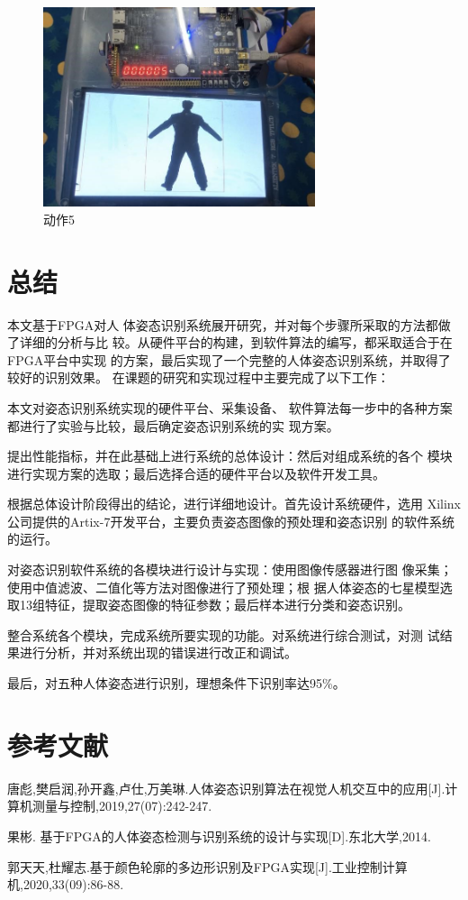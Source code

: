 \documentclass[UTF-8, a4paper, 12pt]{ctexart}
\begin{document}
\begin{figure}[htbp]
    \centering
    \includegraphics[width=8cm]{figs/f7.jpg}
    \caption{动作5}
\end{figure}
\newpage


\section{总结}
本文基于FPGA对人
体姿态识别系统展开研究，并对每个步骤所采取的方法都做了详细的分析与比
较。从硬件平台的构建，到软件算法的编写，都采取适合于在FPGA平台中实现
的方案，最后实现了一个完整的人体姿态识别系统，并取得了较好的识别效果。
在课题的研究和实现过程中主要完成了以下工作：

本文对姿态识别系统实现的硬件平台、采集设备、
软件算法每一步中的各种方案都进行了实验与比较，最后确定姿态识别系统的实
现方案。

提出性能指标，并在此基础上进行系统的总体设计：然后对组成系统的各个
模块进行实现方案的选取；最后选择合适的硬件平台以及软件开发工具。

根据总体设计阶段得出的结论，进行详细地设计。首先设计系统硬件，选用
Xilinx公司提供的Artix-7开发平台，主要负责姿态图像的预处理和姿态识别
的软件系统的运行。

对姿态识别软件系统的各模块进行设计与实现：使用图像传感器进行图
像采集；使用中值滤波、二值化等方法对图像进行了预处理；根
据人体姿态的七星模型选取13组特征，提取姿态图像的特征参数；最后样本进行分类和姿态识别。

整合系统各个模块，完成系统所要实现的功能。对系统进行综合测试，对测
试结果进行分析，并对系统出现的错误进行改正和调试。

最后，对五种人体姿态进行识别，理想条件下识别率达95\%。


\section{参考文献}
\noindent [1]	唐彪,樊启润,孙开鑫,卢仕,万美琳.人体姿态识别算法在视觉人机交互中的应用[J].计算机测量与控制,2019,27(07):242-247.

\noindent [2]	果彬. 基于FPGA的人体姿态检测与识别系统的设计与实现[D].东北大学,2014.

\noindent [3]	郭天天,杜耀志.基于颜色轮廓的多边形识别及FPGA实现[J].工业控制计算机,2020,33(09):86-88.
\end{document}
